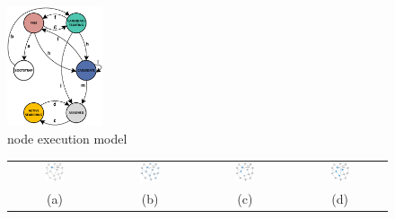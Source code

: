 \begin{figure}
  \centering
    \includegraphics[width=0.25\textwidth]{pictures/dbs_updated.eps}
  \caption{\disr{} node execution model}
  \label{fig:state_machine}
\end{figure}
\begin{itemize}

\begin{figure}
\centering
\begin{tabular}{cccc}
\includegraphics[width=0.23\textwidth]{pictures/seq01.eps} & 
\includegraphics[width=0.23\textwidth]{pictures/seq02.eps} &
\includegraphics[width=0.23\textwidth]{pictures/seq03.eps} & 
\includegraphics[width=0.23\textwidth]{pictures/seq04.eps} \\
(a) & (b) & (c) & (d) \\

\end{tabular}
\end{figure}
\end{itemize}
